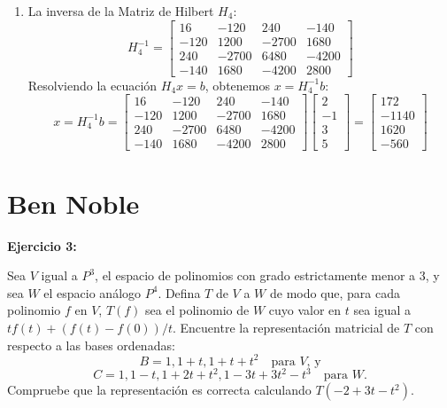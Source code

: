 \documentclass[12pt]{article}
\begin{document}
\begin{enumerate}[label=(\alph*)]
\item La inversa de la Matriz de Hilbert $H_4$:
\begin{equation}
    H_4^{-1}=\begin{bmatrix}
                  16 &  -120 &   240 &  -140 \\ 
                -120 &  1200 & -2700 &  1680 \\
                 240 & -2700 &  6480 & -4200 \\
                -140 &  1680 & -4200 &  2800
             \end{bmatrix}
\end{equation}
Resolviendo la ecuación $H_4x=b$, obtenemos $x=H_4^{-1}b$:
\begin{equation}
    x =H_4^{-1}b=\begin{bmatrix}
                      16 &  -120 &   240 &  -140 \\ 
                    -120 &  1200 & -2700 &  1680 \\
                     240 & -2700 &  6480 & -4200 \\
                    -140 &  1680 & -4200 &  2800
                 \end{bmatrix}
                 \begin{bmatrix}
                     2 \\ 
                    -1 \\
                     3 \\
                     5
                 \end{bmatrix} = 
                 \begin{bmatrix}
                      172 \\ 
                    -1140 \\ 
                     1620 \\ 
                     -560
                 \end{bmatrix}
\end{equation}


\end{enumerate}



%
\section{Ben Noble}
\noindent \textbf{Ejercicio 3:}

Sea $V$ igual a $P^3$, el espacio de polinomios con grado estrictamente menor a 3, y sea $W$ el espacio análogo $P^4$. Defina $T$ de $V$ a $W$ de modo que, para cada polinomio $f$ en $V$, $T(f)$ sea el polinomio de $W$ cuyo valor en $t$ sea igual a $tf(t)+(f(t)-f(0))/t$. Encuentre la representación matricial de $T$ con respecto a las bases ordenadas:
$$B={1, 1+t, 1+t+t^2} \quad \text{para $V$, y}$$
$$C={1, 1-t, 1+2t+t^2, 1-3t+3t^2-t^3} \quad \text{para $W$.}$$
Compruebe que la representación es correcta calculando $T(-2+3t-t^2)$.\\
\end{document}
